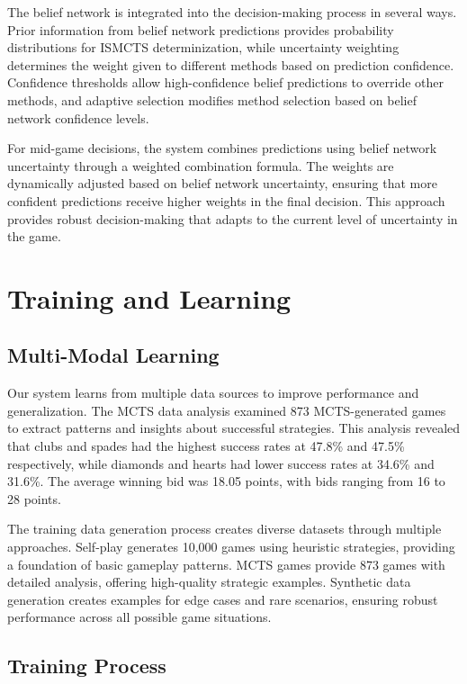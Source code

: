 \documentclass[conference]{IEEEtran}
\begin{document}
The belief network is integrated into the decision-making process in several ways. Prior information from belief network predictions provides probability distributions for ISMCTS determinization, while uncertainty weighting determines the weight given to different methods based on prediction confidence. Confidence thresholds allow high-confidence belief predictions to override other methods, and adaptive selection modifies method selection based on belief network confidence levels.

For mid-game decisions, the system combines predictions using belief network uncertainty through a weighted combination formula. The weights are dynamically adjusted based on belief network uncertainty, ensuring that more confident predictions receive higher weights in the final decision. This approach provides robust decision-making that adapts to the current level of uncertainty in the game.

\section{Training and Learning}

\subsection{Multi-Modal Learning}

Our system learns from multiple data sources to improve performance and generalization. The MCTS data analysis examined 873 MCTS-generated games to extract patterns and insights about successful strategies. This analysis revealed that clubs and spades had the highest success rates at 47.8\% and 47.5\% respectively, while diamonds and hearts had lower success rates at 34.6\% and 31.6\%. The average winning bid was 18.05 points, with bids ranging from 16 to 28 points.

The training data generation process creates diverse datasets through multiple approaches. Self-play generates 10,000 games using heuristic strategies, providing a foundation of basic gameplay patterns. MCTS games provide 873 games with detailed analysis, offering high-quality strategic examples. Synthetic data generation creates examples for edge cases and rare scenarios, ensuring robust performance across all possible game situations.

\subsection{Training Process}
\end{document}
